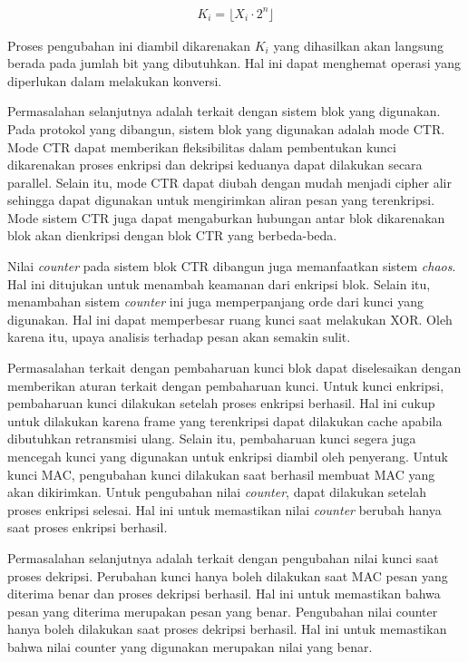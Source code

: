 \begin{equation}
  \begin{aligned}
    K_i = \lfloor{X_i \cdot 2^{n}}\rfloor
  \end{aligned}
  \label{eq:tls.convert.int}
\end{equation}

Proses pengubahan ini diambil dikarenakan $K_i$ yang dihasilkan akan langsung berada pada jumlah bit yang dibutuhkan. Hal ini dapat menghemat operasi yang diperlukan dalam melakukan konversi.

Permasalahan selanjutnya adalah terkait dengan sistem blok yang digunakan. Pada protokol yang dibangun, sistem blok yang digunakan adalah mode CTR. Mode CTR dapat memberikan fleksibilitas dalam pembentukan kunci dikarenakan proses enkripsi dan dekripsi keduanya dapat dilakukan secara parallel. Selain itu, mode CTR dapat diubah dengan mudah menjadi cipher alir sehingga dapat digunakan untuk mengirimkan aliran pesan yang terenkripsi. Mode sistem CTR juga dapat mengaburkan hubungan antar blok dikarenakan blok akan dienkripsi dengan blok CTR yang berbeda-beda.

Nilai \emph{counter} pada sistem blok CTR dibangun juga memanfaatkan sistem \emph{chaos}. Hal ini ditujukan untuk menambah keamanan dari enkripsi blok. Selain itu, menambahan sistem \emph{counter} ini juga memperpanjang orde dari kunci yang digunakan. Hal ini dapat memperbesar ruang kunci saat melakukan XOR. Oleh karena itu, upaya analisis terhadap pesan akan semakin sulit.

Permasalahan terkait dengan pembaharuan kunci blok dapat diselesaikan dengan memberikan aturan terkait dengan pembaharuan kunci. Untuk kunci enkripsi, pembaharuan kunci dilakukan setelah proses enkripsi berhasil. Hal ini cukup untuk dilakukan karena frame yang terenkripsi dapat dilakukan cache apabila dibutuhkan retransmisi ulang. Selain itu, pembaharuan kunci segera juga mencegah kunci yang digunakan untuk enkripsi diambil oleh penyerang. Untuk kunci MAC, pengubahan kunci dilakukan saat berhasil membuat MAC yang akan dikirimkan. Untuk pengubahan nilai \emph{counter}, dapat dilakukan setelah proses enkripsi selesai. Hal ini untuk memastikan nilai \emph{counter} berubah hanya saat proses enkripsi berhasil.

Permasalahan selanjutnya adalah terkait dengan pengubahan nilai kunci saat proses dekripsi. Perubahan kunci hanya boleh dilakukan saat MAC pesan yang diterima benar dan proses dekripsi berhasil. Hal ini untuk memastikan bahwa pesan yang diterima merupakan pesan yang benar. Pengubahan nilai counter hanya boleh dilakukan saat proses dekripsi berhasil. Hal ini untuk memastikan bahwa nilai counter yang digunakan merupakan nilai yang benar.

